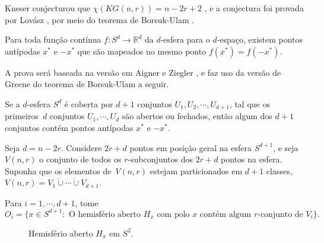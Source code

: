 Kneser conjecturou que $\chi(KG(n,r)) = n-2r+2$ \cite{kneser1955aufgabe}, e a conjectura foi provada por Lovász \cite{lovasz1978kneser}, por meio do teorema de Borsuk-Ulam \cite{borsuk1933drei}.

\begin{teorema}\label{thborsukulam}
Para toda função contínua $f: S^d \rightarrow\mathbb{R}^d$ da $d$-esfera para o $d$-espaço, existem pontos antípodas $x^*$ e $-x^*$ que são mapeados no mesmo ponto $f(x^*) = f(-x^*)$.
\end{teorema}

A prova será baseada na versão em Aigner e Ziegler \cite{aigner2010proofs}, e faz uso da versão de Greene do teorema de Borsuk-Ulam \cite{greene2002new} a seguir.

\begin{teorema}\label{thgreene}
Se a $d$-esfera $S^d$ é coberta por $d+1$ conjuntos $U_1, U_2, \cdots, U_{d+1}$, tal que os primeiros~$d$ conjuntos $U_1,\cdots,U_d$ são abertos ou fechados, então algum dos $d+1$ conjuntos contém pontos antípodas $x^*$ e $-x^*$.
\end{teorema}

Seja $d = n - 2r$. Considere $2r+d$ pontos em posição geral na esfera $S^{d+1}$, e seja $V(n,r)$ o conjunto de todos os $r$-subconjuntos dos $2r+d$ pontos na esfera. Suponha que os elementos de~$V(n,r)$ estejam particionados em $d+1$ classes, $V(n,r) = V_1 \dot\cup \cdots \dot\cup V_{d+1}$.

Para $i=1,\cdots,d+1$, tome \[O_i = \{x\in S^{d+1} : \text{ O hemisfério aberto } H_x \text{ com polo } x \text{ contém algum } r\text{-conjunto de } V_i\}.\]

\begin{figure}[H]
\centering
{}
\caption{Hemisfério aberto $H_x$ em $S^2$.}
\label{fig:kneserhemisphere}
\end{figure}

